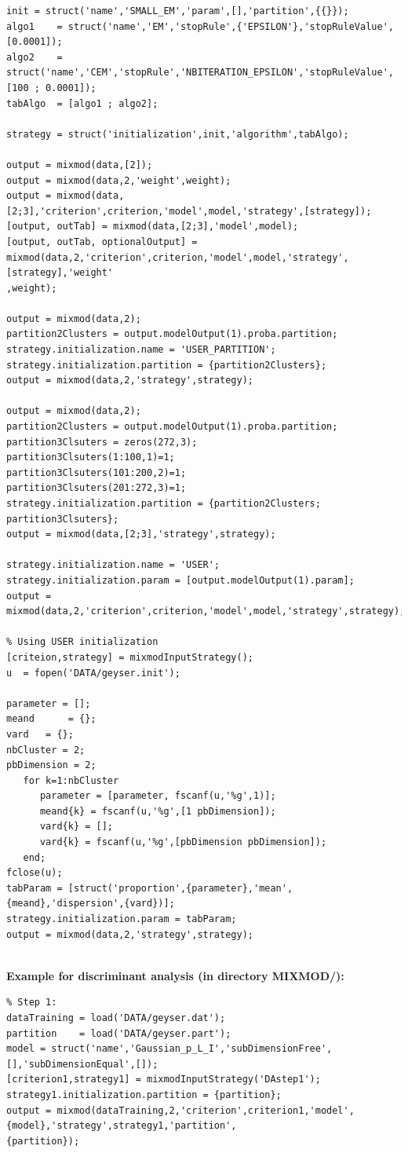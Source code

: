 \begin{itemize}
{\begin{verbatim}
init = struct('name','SMALL_EM','param',[],'partition',{{}});
algo1    = struct('name','EM','stopRule',{'EPSILON'},'stopRuleValue',[0.0001]);
algo2    = struct('name','CEM','stopRule','NBITERATION_EPSILON','stopRuleValue',[100 ; 0.0001]);
tabAlgo  = [algo1 ; algo2];

strategy = struct('initialization',init,'algorithm',tabAlgo);

output = mixmod(data,[2]);
output = mixmod(data,2,'weight',weight);
output = mixmod(data,[2;3],'criterion',criterion,'model',model,'strategy',[strategy]);
[output, outTab] = mixmod(data,[2;3],'model',model);
[output, outTab, optionalOutput] = mixmod(data,2,'criterion',criterion,'model',model,'strategy',[strategy],'weight'
,weight);

output = mixmod(data,2);
partition2Clusters = output.modelOutput(1).proba.partition;
strategy.initialization.name = 'USER_PARTITION';
strategy.initialization.partition = {partition2Clusters};
output = mixmod(data,2,'strategy',strategy);

output = mixmod(data,2);
partition2Clusters = output.modelOutput(1).proba.partition;
partition3Clsuters = zeros(272,3);
partition3Clsuters(1:100,1)=1;
partition3Clsuters(101:200,2)=1;
partition3Clsuters(201:272,3)=1;
strategy.initialization.partition = {partition2Clusters;  partition3Clsuters};
output = mixmod(data,[2;3],'strategy',strategy);

strategy.initialization.name = 'USER';
strategy.initialization.param = [output.modelOutput(1).param];
output = mixmod(data,2,'criterion',criterion,'model',model,'strategy',strategy);

% Using USER initialization
[criteion,strategy] = mixmodInputStrategy();
u  = fopen('DATA/geyser.init');

parameter = [];
meand      = {};
vard   = {};
nbCluster = 2;
pbDimension = 2;
   for k=1:nbCluster
      parameter = [parameter, fscanf(u,'%g',1)];
      meand{k} = fscanf(u,'%g',[1 pbDimension]);
      vard{k} = [];
      vard{k} = fscanf(u,'%g',[pbDimension pbDimension]);
   end;
fclose(u);
tabParam = [struct('proportion',{parameter},'mean',{meand},'dispersion',{vard})];
strategy.initialization.param = tabParam;
output = mixmod(data,2,'strategy',strategy);


 \end{verbatim}

{\normalsize \textbf{ Example for discriminant analysis (in directory MIXMOD/):}}\\


 \begin{verbatim}
% Step 1:
dataTraining = load('DATA/geyser.dat');
partition    = load('DATA/geyser.part');
model = struct('name','Gaussian_p_L_I','subDimensionFree',[],'subDimensionEqual',[]);
[criterion1,strategy1] = mixmodInputStrategy('DAstep1');
strategy1.initialization.partition = {partition};
output = mixmod(dataTraining,2,'criterion',criterion1,'model',{model},'strategy',strategy1,'partition',
{partition});


\end{verbatim}}
\end{itemize}
